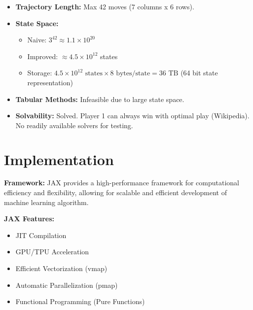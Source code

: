 \documentclass[aspectratio=169,xcolor=dvipsnames]{beamer}
\begin{document}
\begin{frame}{}
    \begin{itemize}
        \item \textbf{Trajectory Length:} Max 42 moves (7 columns x 6 rows).
        \item \textbf{State Space:}
            \begin{itemize}
                \item Naive: $3^{42} \approx 1.1 \times 10^{20}$
                \item Improved: $\approx 4.5 \times 10^{12}$ states
                \item Storage: $4.5 \times 10^{12} \text{ states} \times 8 \text{ bytes/state} = 36 \text{ TB}$ (64 bit state representation)
            \end{itemize}
        \item \textbf{Tabular Methods:} Infeasible due to large state space.
        \item \textbf{Solvability:} Solved. Player 1 can always win with optimal play (Wikipedia). No readily available solvers for testing.
    \end{itemize}
\end{frame}

\section{Implementation}

\begin{frame}{}

\textbf{Framework:} JAX provides a high-performance framework for computational efficiency and flexibility, allowing for scalable and efficient development of machine learning algorithm.

\vspace{2.5em}

\textbf{JAX Features:}
\begin{itemize}
    \item JIT Compilation
    \item GPU/TPU Acceleration
    \item Efficient Vectorization (vmap)
    \item Automatic Parallelization (pmap)
    \item Functional Programming (Pure Functions)
\end{itemize}
\end{frame}
\end{document}
